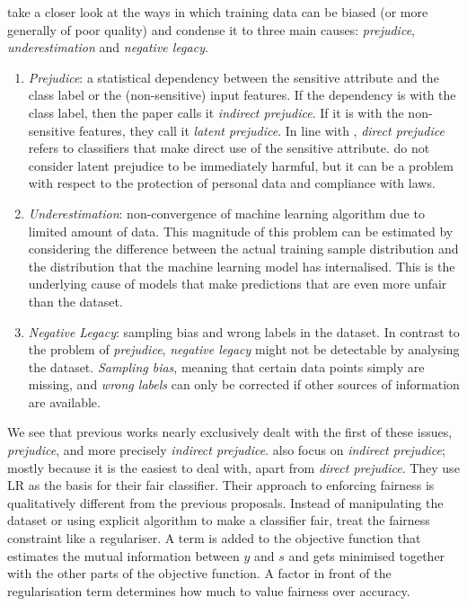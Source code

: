 \citet{kamishima2012fairness} take a closer look at the ways in which training data can be biased
(or more generally of poor quality) and condense it to three main causes: \emph{prejudice},
\emph{underestimation} and \emph{negative legacy}.

\begin{enumerate} \item \emph{Prejudice}: a statistical dependency between the sensitive attribute
  and the class label or the (non-sensitive) input features. If the dependency is with the class
  label, then the paper calls it \emph{indirect prejudice}. If it is with the non-sensitive
  features, they call it \emph{latent prejudice}. In line with \citet{pedreshi2008discrimination},
  \emph{direct prejudice} refers to classifiers that make direct use of the sensitive attribute.
  \citet{kamishima2012fairness} do not consider latent prejudice to be immediately harmful, but it
  can be a problem with respect to the protection of personal data and compliance with laws. \item
  \emph{Underestimation}: non-convergence of machine learning algorithm due to limited amount of
  data. This magnitude of this problem can be estimated by considering the difference between the
  actual training sample distribution and the distribution that the machine learning model has
  internalised. This is the underlying cause of models that make predictions that are even more
  unfair than the dataset. \item \emph{Negative Legacy}: sampling bias and wrong labels in the
  dataset. In contrast to the problem of \emph{prejudice}, \emph{negative legacy} might not be
  detectable by analysing the dataset. \emph{Sampling bias}, meaning that certain data points
  simply are missing, and \emph{wrong labels} can only be corrected if other sources of information
  are available. \end{enumerate}

We see that previous works nearly exclusively dealt with the first of these issues,
\emph{prejudice}, and more precisely \emph{indirect prejudice}. \citet{kamishima2012fairness} also
focus on \emph{indirect prejudice}; mostly because it is the easiest to deal with, apart from
\emph{direct prejudice}. They use \acf{LR} as the basis for their fair classifier. Their approach
to enforcing fairness is qualitatively different from the previous proposals. Instead of
manipulating the dataset or using explicit algorithm to make a classifier fair,
\citet{kamishima2012fairness} treat the fairness constraint like a regulariser. A term is added to
the objective function that estimates the mutual information between \(y\) and \(s\) and gets
minimised together with the other parts of the objective function.
A factor in front of the regularisation term determines how much to value fairness over accuracy.

